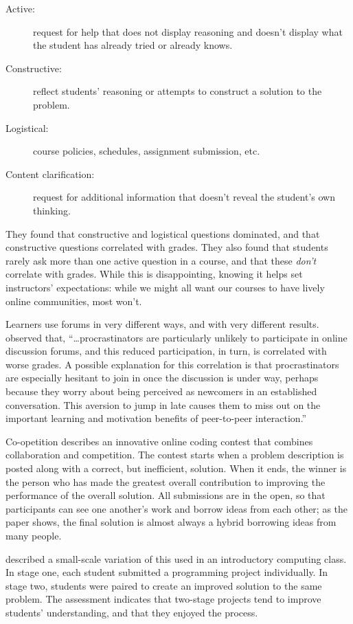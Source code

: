 \begin{description}
\item[Active:]
request for help that does not display reasoning and doesn't display
what the student has already tried or already knows.
\item[Constructive:]
reflect students' reasoning or attempts to construct a solution to
the problem.
\item[Logistical:]
course policies, schedules, assignment submission, etc.
\item[Content clarification:]
request for additional information that doesn't reveal the student's
own thinking.
\end{description}

They found that constructive and logistical questions dominated, and
that constructive questions correlated with grades. They also found that
students rarely ask more than one active question in a course, and that
these \emph{don't} correlate with grades. While this is disappointing,
knowing it helps set instructors' expectations: while we might all want
our courses to have lively online communities, most won't.

Learners use forums in very different ways, and with very different
results. \cite{Mill2016a} observed that, ``{\ldots}procrastinators are
particularly unlikely to participate in online discussion forums, and
this reduced participation, in turn, is correlated with worse
grades. A possible explanation for this correlation is that
procrastinators are especially hesitant to join in once the discussion
is under way, perhaps because they worry about being perceived as
newcomers in an established conversation. This aversion to jump in
late causes them to miss out on the important learning and motivation
benefits of peer-to-peer interaction.''

\begin{aside}{Co-opetition}
  \cite{Gull2004} describes an innovative online coding contest that
  combines collaboration and competition. The contest starts when a
  problem description is posted along with a correct, but inefficient,
  solution. When it ends, the winner is the person who has made the
  greatest overall contribution to improving the performance of the
  overall solution. All submissions are in the open, so that
  participants can see one another's work and borrow ideas from each
  other; as the paper shows, the final solution is almost always a
  hybrid borrowing ideas from many people.

  \cite{Batt2018} described a small-scale variation of this used in
  an introductory computing class. In stage one, each student submitted
  a programming project individually. In stage two, students were paired
  to create an improved solution to the same problem. The assessment
  indicates that two-stage projects tend to improve students'
  understanding, and that they enjoyed the process.
\end{aside}

